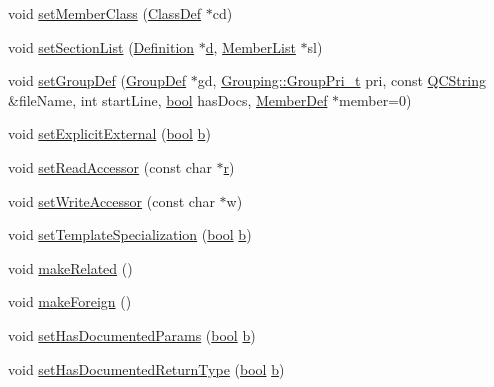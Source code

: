 \begin{DoxyCompactItemize}
void \hyperlink{class_member_def_af09c449c41978bfef628cb7cbfe47846}{set\+Member\+Class} (\hyperlink{class_class_def}{Class\+Def} $\ast$cd)
\item 
void \hyperlink{class_member_def_ac17cfa09998e5486dcfcf12d4cd84216}{set\+Section\+List} (\hyperlink{class_definition}{Definition} $\ast$\hyperlink{060__command__switch_8tcl_af43f4b1f0064a33b2d662af9f06d3a00}{d}, \hyperlink{class_member_list}{Member\+List} $\ast$sl)
\item 
void \hyperlink{class_member_def_a81ef66839371bde9adeae597316c0e24}{set\+Group\+Def} (\hyperlink{class_group_def}{Group\+Def} $\ast$gd, \hyperlink{struct_grouping_a9f0ec5ab376b083ebe3274ea79fd2d70}{Grouping\+::\+Group\+Pri\+\_\+t} pri, const \hyperlink{class_q_c_string}{Q\+C\+String} \&file\+Name, int start\+Line, \hyperlink{qglobal_8h_a1062901a7428fdd9c7f180f5e01ea056}{bool} has\+Docs, \hyperlink{class_member_def}{Member\+Def} $\ast$member=0)
\item 
void \hyperlink{class_member_def_a55bede40fd7126a15697d0f9c40e3377}{set\+Explicit\+External} (\hyperlink{qglobal_8h_a1062901a7428fdd9c7f180f5e01ea056}{bool} \hyperlink{060__command__switch_8tcl_a68bdb74c144118d936931c46f75d4b3e}{b})
\item 
void \hyperlink{class_member_def_a8eb657e57a9c7ec2e002527beae6eb7d}{set\+Read\+Accessor} (const char $\ast$\hyperlink{060__command__switch_8tcl_a0a0bd3dc69dd06934c4e6362155e0ace}{r})
\item 
void \hyperlink{class_member_def_ac9faa4b8dbe3973d98885e92b6d9481f}{set\+Write\+Accessor} (const char $\ast$w)
\item 
void \hyperlink{class_member_def_acfbb6c95a95244ad51c79f2921e359fb}{set\+Template\+Specialization} (\hyperlink{qglobal_8h_a1062901a7428fdd9c7f180f5e01ea056}{bool} \hyperlink{060__command__switch_8tcl_a68bdb74c144118d936931c46f75d4b3e}{b})
\item 
void \hyperlink{class_member_def_a1c119ec90a4e57712f35eb30173c83c9}{make\+Related} ()
\item 
void \hyperlink{class_member_def_a17267c1090bb5b89524750dcba663fbf}{make\+Foreign} ()
\item 
void \hyperlink{class_member_def_a105bb9da9ad6116e49376717f81f8e1c}{set\+Has\+Documented\+Params} (\hyperlink{qglobal_8h_a1062901a7428fdd9c7f180f5e01ea056}{bool} \hyperlink{060__command__switch_8tcl_a68bdb74c144118d936931c46f75d4b3e}{b})
\item 
void \hyperlink{class_member_def_af5fea59efd61c336be4ce8f2512462da}{set\+Has\+Documented\+Return\+Type} (\hyperlink{qglobal_8h_a1062901a7428fdd9c7f180f5e01ea056}{bool} \hyperlink{060__command__switch_8tcl_a68bdb74c144118d936931c46f75d4b3e}{b})

\end{DoxyCompactItemize}
